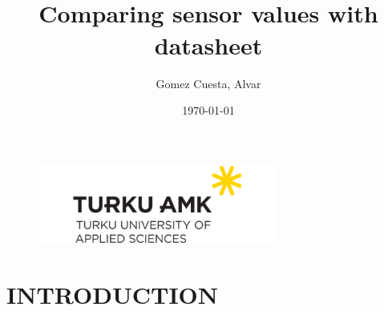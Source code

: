 \documentclass[14pt]{article}
\title{\textbf{\huge{\titulo}}\\
	{Comparing sensor values with datasheet}}
\author{Gomez Cuesta, Alvar}
\date{\today}
\begin{document}
	\selectfont
	\begin{figure}
		\centering
		\includegraphics[width=0.7\textwidth]{./images/turunamk_logo.png}
	\end{figure}
	\maketitle
	
	\newpage
	\tableofcontents
	\newpage
	
	\section{INTRODUCTION}
\end{document}
